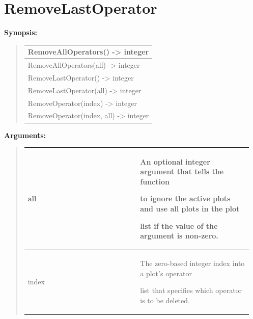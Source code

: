 \documentclass[letterpaper,10pt,english]{sphinxmanual}
\begin{document}
\section{RemoveLastOperator}
\label{functions:removelastoperator}
\begin{DUlineblock}{0em}
\item[] \textbf{Synopsis:}
\end{DUlineblock}
\begin{quote}

\begin{tabulary}{\linewidth}{|L|}
\hline

RemoveAllOperators() -\textgreater{} integer
\\
\hline
RemoveAllOperators(all) -\textgreater{} integer
\\
\hline
RemoveLastOperator() -\textgreater{} integer
\\
\hline
RemoveLastOperator(all) -\textgreater{} integer
\\
\hline
RemoveOperator(index) -\textgreater{} integer
\\
\hline
RemoveOperator(index, all) -\textgreater{} integer
\\
\hline\end{tabulary}

\end{quote}

\begin{DUlineblock}{0em}
\item[] 
\item[] \textbf{Arguments:}
\end{DUlineblock}
\begin{quote}

\begin{tabular}{|p{0.475\linewidth}|p{0.475\linewidth}|}
\hline

all
 & 
\begin{DUlineblock}{0em}
\item[] An optional integer argument that tells the function
\item[] to ignore the active plots and use all plots in the plot
\item[] list if the value of the argument is non-zero.
\end{DUlineblock}
\\
\hline
index
 & 
\begin{DUlineblock}{0em}
\item[] The zero-based integer index into a plot's operator
\item[] list that specifies which operator is to be deleted.
\end{DUlineblock}
\\
\hline\end{tabular}

\end{quote}
\end{document}
